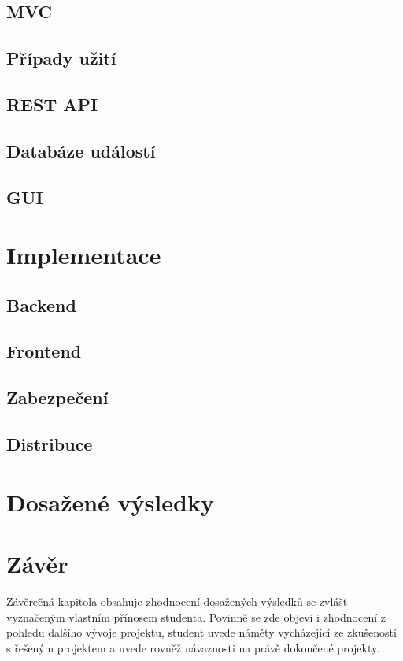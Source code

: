 \section{MVC}
\label{sec:mvc}


\section{Případy užití}
\section{REST API}
\label{restapi}
\section{Databáze událostí}
\section{GUI}

\chapter{Implementace}
\section{Backend}
\section{Frontend}
\section{Zabezpečení}
\section{Distribuce}

\chapter{Dosažené výsledky}

\chapter{Závěr}
Závěrečná kapitola obsahuje zhodnocení dosažených výsledků se zvlášť vyznačeným vlastním přínosem studenta. Povinně se zde objeví i zhodnocení z pohledu dalšího vývoje projektu, student uvede náměty vycházející ze zkušeností s řešeným projektem a uvede rovněž návaznosti na právě dokončené projekty.

